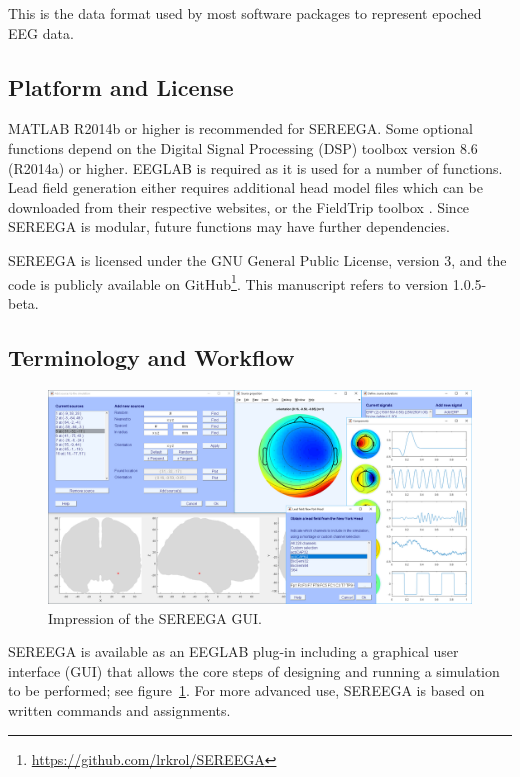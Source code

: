 This is the data format used by most software packages to represent epoched EEG data.


\subsection{Platform and License}

MATLAB R2014b or higher is recommended for SEREEGA. Some optional functions depend on the Digital Signal Processing (DSP) toolbox version 8.6 (R2014a) or higher. EEGLAB \cite{delorme2004eeglab} is required as it is used for a number of functions. Lead field generation either requires additional head model files which can be downloaded from their respective websites, or the FieldTrip toolbox \cite{oostenveld2011fieldtrip}. Since SEREEGA is modular, future functions may have further dependencies.

SEREEGA is licensed under the GNU General Public License, version 3, and the code is publicly available on GitHub\footnote{\href{https://github.com/lrkrol/SEREEGA}{https://github.com/lrkrol/SEREEGA}}. This manuscript refers to version 1.0.5-beta.


\subsection{Terminology and Workflow}

\begin{figure}
    \centering
    \includegraphics[width=5in]{figures/sereega-gui.png}
    \caption{Impression of the SEREEGA GUI.}
    \label{fig:sereega:gui}
\end{figure}

SEREEGA is available as an EEGLAB plug-in including a graphical user interface (GUI) that allows the core steps of designing and running a simulation to be performed; see figure~\ref{fig:sereega:gui}. For more advanced use, SEREEGA is based on written commands and assignments.

